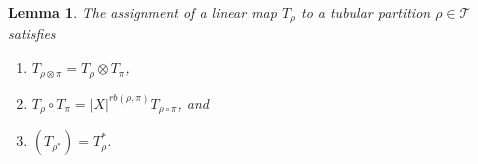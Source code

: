 \documentclass[12pt, a4paper]{amsart}
\def\NC{\operatorname{NC}}
\def\Hom{\operatorname{Hom}}
\def\CC{\mathcal{C}}
\def\HH{\mathcal{H}}
\def\TT{\mathcal{T}}
\newtheorem{lemma}[thm]{Lemma}
\theoremstyle{definition}
\theoremstyle{remark}
\numberwithin{equation}{section}
\begin{document}
%
%
%
%
%



\begin{lemma}\label{lem: propsofTs}
The assignment of a linear map $T_\rho$ to a tubular partition $\rho \in \TT$ satisfies
\begin{enumerate}
 \item \label{linearmaptensors} $T_{\rho\otimes\pi} = T_\rho\otimes T_\pi$,
 \item \label{linearmapcomposition} $T_\rho\circ T_\pi = |X|^{rb(\rho,\pi)} T_{\rho\circ\pi}$, and
 \item \label{linearmapadjoint} $(T_{\rho^*}) = T_\rho^*$.
\end{enumerate}
\end{lemma}
\end{document}
